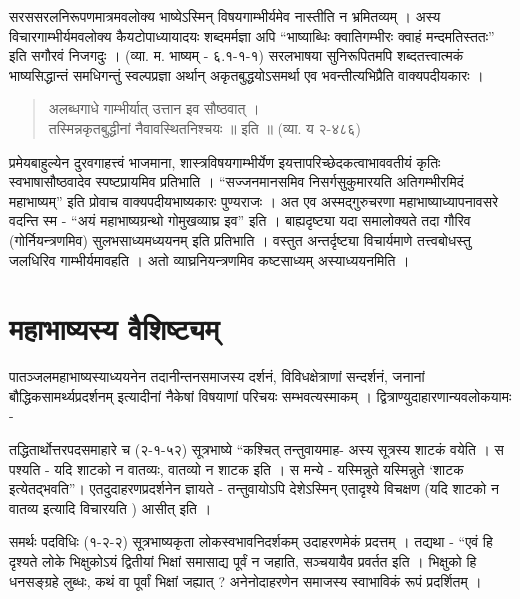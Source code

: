 सरससरलनिरूपणमात्रमवलोक्य भाष्येऽस्मिन् विषयगाम्भीर्यमेव नास्तीति न भ्रमितव्यम् । अस्य विचारगाम्भीर्यमवलोक्य कैयटोपाध्यायादयः शब्दमर्मज्ञा अपि “भाष्याब्धिः क्वातिगम्भीरः क्वाहं मन्दमतिस्ततः” इति सगौरवं निजगदुः । (व्या. म. भाष्यम् - ६.१-१-१) सरलभाषया सुनिरूपितमपि शब्दतत्त्वात्मकं भाष्यसिद्धान्तं समधिगन्तुं स्वल्पप्रज्ञा अर्थान् अकृतबुद्धयोऽसमर्था एव भवन्तीत्यभिप्रैति वाक्यपदीयकारः ।
\begin{verse}
अलब्धगाधे गाम्भीर्यात् उत्तान इव सौष्ठवात् ।\\
तस्मिन्नकृतबुद्धीनां नैवावस्थितनिश्चयः ॥ इति ॥ (व्या. य २-४८६)
\end{verse}
प्रमेयबाहुल्येन दुरवगाहत्त्वं भाजमाना, शास्त्रविषयगाम्भीर्येण इयत्तापरिच्छेदकत्वाभाववतीयं कृतिः स्वभाषासौष्ठवादेव स्पष्टप्रायमिव प्रतिभाति । “सज्जनमानसमिव निसर्गसुकुमारयति अतिगम्भीरमिदं महाभाष्यम्” इति प्रोवाच वाक्यपदीयभाष्यकारः पुण्यराजः । अत एव अस्मद्गुरुचरणा महाभाष्याध्यापनावसरे वदन्ति स्म - “अयं महाभाष्यग्रन्थो गोमुखव्याघ्र इव” इति । बाह्यदृष्ट्या यदा समालोक्यते तदा गौरिव (गोर्नियन्त्रणमिव) सुलभसाध्यमध्ययनम् इति प्रतिभाति । वस्तुत अन्तर्दृष्ट्या विचार्यमाणे तत्त्वबोधस्तु जलधिरिव गाम्भीर्यमावहति । अतो व्याघ्रनियन्त्रणमिव कष्टसाध्यम् अस्याध्ययनमिति ।

\section*{महाभाष्यस्य वैशिष्ट्यम्} 

पातञ्जलमहाभाष्यस्याध्ययनेन तदानीन्तनसमाजस्य दर्शनं, विविधक्षेत्राणां सन्दर्शनं, जनानां बौद्धिकसामर्थ्यप्रदर्शनम् इत्यादीनां नैकेषां विषयाणां परिचयः सम्भवत्यस्माकम् । द्वित्राण्युदाहारणान्यवलोकयामः -

तद्धितार्थोत्तरपदसमाहारे च (२-१-५२) सूत्रभाष्ये “कश्चित् तन्तुवायमाह- अस्य सूत्रस्य शाटकं वयेति । स पश्यति - यदि शाटको न वातव्यः, वातव्यो न शाटक इति । स मन्ये - यस्मिन्नुते यस्मिन्नुते ‘शाटक इत्येतद्भवति”। एतदुदाहरणप्रदर्शनेन ज्ञायते - तन्तुवायोऽपि देशेऽस्मिन् एतादृश्ये विचक्षण (यदि शाटको न वातव्य इत्यादि विचारयति ) आसीत् इति ।

समर्थः पदविधिः (१-२-२) सूत्रभाष्यकृता लोकस्वभावनिदर्शकम् उदाहरणमेकं प्रदत्तम् । तद्यथा - “एवं हि दृश्यते लोके भिक्षुकोऽयं द्वितीयां भिक्षां समासाद्य पूर्वं न जहाति, सञ्चयायैव प्रवर्तत इति । भिक्षुको हि धनसङ्ग्रहे लुब्धः, कथं वा पूर्वां भिक्षां जह्यात् ? अनेनोदाहरणेन समाजस्य स्वाभाविकं रूपं प्रदर्शितम् ।

